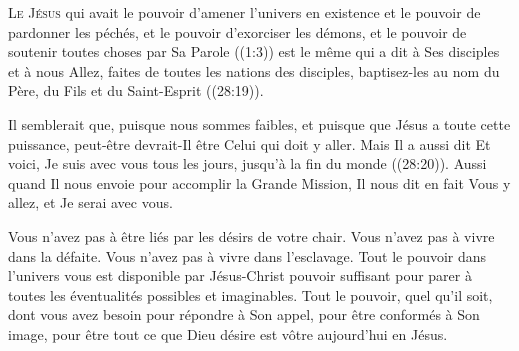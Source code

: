 \lettrine{L}{e Jésus} qui avait le pouvoir d'amener l'univers
 en existence et le pouvoir de pardonner les péchés,
 et le pouvoir d'exorciser les démons, et le pouvoir de soutenir
 toutes choses par Sa Parole ((1:3))
 est le même qui a dit à Ses disciples \ocadr et à nous \fcadr{}\frcolon{} 
 \Og Allez, faites de toutes les nations des disciples,
 baptisez-les au nom du Père, du Fils et du Saint-Esprit \Fg{}
 ((28:19)). 

Il semblerait que, puisque nous sommes faibles, et puisque que Jésus
 a toute cette puissance, peut-être devrait-Il être Celui qui doit y aller.
 Mais Il a aussi dit\frcolon{} 
 \Og Et voici, Je suis avec vous tous les jours,
 jusqu'à la fin du monde \Fg{} ((28:20)).
 Aussi quand Il nous envoie pour accomplir la Grande Mission,
 Il nous dit en fait\frcolon{} 
 \Og Vous y allez, et Je serai avec vous. \Fg{}



Vous n'avez pas à être liés par les désirs de votre chair.
 Vous n'avez pas à vivre dans la défaite. Vous n'avez pas à vivre
 dans l'esclavage. Tout le pouvoir dans l'univers vous est disponible
 par Jésus-Christ \ocadr pouvoir suffisant pour parer à toutes
 les éventualités possibles et imaginables.
 Tout le pouvoir, quel qu'il soit, dont vous avez besoin
 pour répondre à Son appel, pour être conformés à Son image,
 pour être tout ce que Dieu désire est vôtre aujourd'hui en Jésus. 

\dvrule







